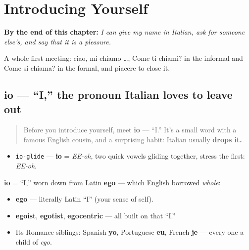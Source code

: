 
\chapter{Introducing Yourself}
\label{ch:it-introductions}

\begin{chapteropening}
\textbf{By the end of this chapter:} \emph{I can give my name in Italian, ask for someone else's, and say that it is a pleasure.}

A whole first meeting: ciao, mi chiamo …, Come ti chiami? in the informal and Come si chiama? in the formal, and piacere to close it.
\end{chapteropening}

\section[io]{io — \textquotedblleft{}I,\textquotedblright{} the pronoun Italian loves to leave out}

\label{lesson:IT-C03-io}



\begin{quote}
Before you introduce yourself, meet \textbf{io} — \textquotedblleft{}I.\textquotedblright{} It's a small word with a famous English cousin, and a surprising habit: Italian usually \textbf{drops it.}
\end{quote}

\begin{sounds}
\begin{itemize}
\raggedright
  \item \texttt{io-glide} — \textbf{io} = \emph{EE-oh}, two quick vowels gliding together, stress the first: \emph{EE-oh}.
\end{itemize}
\end{sounds}

\begin{cousinweb}
\textbf{io} = \textquotedblleft{}I,\textquotedblright{} worn down from Latin \textbf{ego} — which English borrowed \emph{whole}:

\begin{itemize}
\raggedright
  \item \textbf{ego} — literally Latin \textquotedblleft{}I\textquotedblright{} (your sense of self).
  \item \textbf{egoist}, \textbf{egotist}, \textbf{egocentric} — all built on that \textquotedblleft{}I.\textquotedblright{}
  \item Its Romance siblings: Spanish \textbf{yo}, Portuguese \textbf{eu}, French \textbf{je} — every one a child of \emph{ego}.
\end{itemize}
\end{cousinweb}

